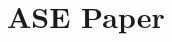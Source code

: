 \chapter[ASE Paper]
{ASE Paper}%
\label{ch:ase2020}
\graphicspath{{mainmatter/publications/figures/icsme2020/}}

